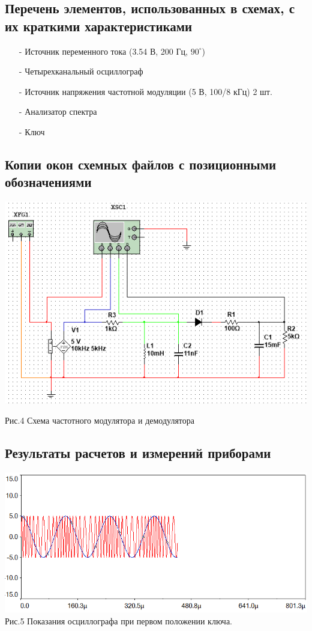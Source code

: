 \documentclass[11pt]{article}
\begin{document}
\subsection{Перечень элементов, использованных в схемах, с
их краткими характеристиками}
\begin{itemize}
    \item[-] Источник переменного тока (3.54 В, 200 Гц, $90^\circ$)
    \item[-] Четырехканальный осциллограф
    \item[-] Источник напряжения частотной модуляции (5 В, 100/8 кГц) 2 шт.
    \item[-] Анализатор спектра 
    \item[-] Ключ
\end{itemize}

\subsection{Копии окон схемных файлов с позиционными обозначениями}
\includegraphics[width=1\linewidth]{img/scheme2.png}
\begin{center}
    Рис.4 Схема частотного модулятора и демодулятора
\end{center}

\subsection{Результаты расчетов и измерений приборами}
\begin{center}
    \includegraphics[width=1\linewidth]{img/osc1.png}
        Рис.5 Показания осциллографа при первом положении ключа.
\end{center}
\end{document}
